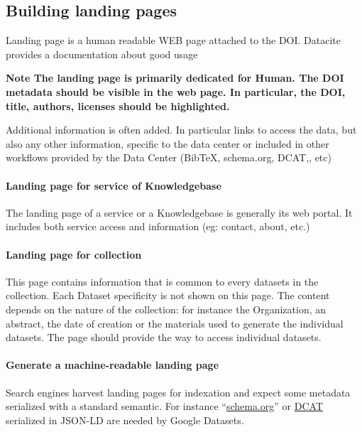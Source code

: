 \documentclass[11pt,a4paper]{ivoa}
\newcommand{\important}[1]{\textbf{\color{ivoacolor}Note #1 \\ }}
\begin{document}
\subsection{Building landing pages}\hypertarget{building-landing-pages}{}\label{sec:building-landing-pages}

Landing page is a human readable WEB page attached to the DOI. Datacite provides a documentation about good usage

\important{The landing page is primarily dedicated for Human. The DOI metadata should be visible in the web page. In particular, the DOI, title, authors, licenses should be highlighted.}

Additional information is often added. In particular links to access the data, but also any other information, specific to the data center or included in other workflows provided by the Data Center (BibTeX, schema.org, DCAT,, etc)

\paragraph{Landing page for service of Knowledgebase} 
The landing page of a service or a Knowledgebase is generally its web portal. It includes both service access and information (eg: contact, about, etc.)

\paragraph{Landing page for collection} 
This page contains information that is common to every datasets in the collection. Each Dataset specificity is not shown on this page. The content depends on the nature of the collection: for instance the Organization, an abstract, the date of creation or the materials used to generate the individual datasets.\newline
The page should provide the way to access individual datasets.

\paragraph{Generate a machine-readable landing page}
Search engines harvest landing pages for indexation and expect some metadata serialized with a standard semantic. For instance ``\href{http://schema.org}{schema.org}'' or \href{https://www.w3.org/TR/vocab-dcat-3/}{DCAT} serialized in JSON-LD are needed by Google Datasets.\\
\end{document}
